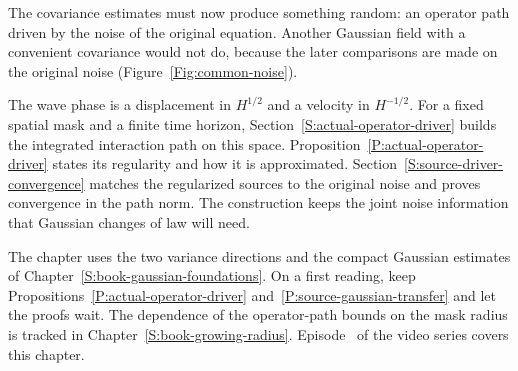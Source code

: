 The covariance estimates must now produce something random: an operator path
driven by the noise of the original equation. Another Gaussian field with a
convenient covariance would not do, because the later comparisons are made
on the original noise (Figure~\ref{Fig:common-noise}).

The wave phase is a displacement in $H^{1/2}$ and a velocity
in $H^{-1/2}$. For a fixed spatial mask and a finite time horizon,
Section~\ref{S:actual-operator-driver} builds the integrated interaction path
on this space. Proposition~\ref{P:actual-operator-driver} states its regularity
and how it is approximated. Section~\ref{S:source-driver-convergence} matches
the regularized sources to the original noise and proves convergence in the
path norm. The construction keeps the joint noise information that Gaussian
changes of law will need.

The chapter uses the two variance directions and the compact
Gaussian estimates of Chapter~\ref{S:book-gaussian-foundations}. On
a first reading, keep Propositions~\ref{P:actual-operator-driver}
and~\ref{P:source-gaussian-transfer} and let the proofs wait. The
dependence of the operator-path bounds on the mask radius is tracked in
Chapter~\ref{S:book-growing-radius}. Episode~
of the video series covers this chapter.
